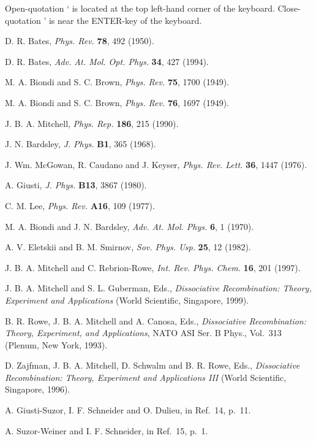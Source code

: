 \documentclass{ws-rv9x6}
\begin{document}
Open-quotation ` is located at the top left-hand corner of the keyboard.
Close-quotation ' is near the ENTER-key of the keyboard.

\begin{thebibliography}{000}
D. R. Bates, {\it Phys. Rev.} {\bf 78}, 492 (1950).

D. R. Bates, {\it Adv. At. Mol. Opt. Phys.} {\bf 34}, 427 (1994).

M. A. Biondi and S. C. Brown, {\it Phys. Rev.} {\bf 75}, 1700 (1949).

M. A. Biondi and S. C. Brown, {\it Phys. Rev.} {\bf 76}, 1697 (1949).

J. B. A. Mitchell, {\it Phys. Rep.} {\bf 186}, 215 (1990).

J. N. Bardsley, {\it J. Phys.} {\bf B1}, 365 (1968).

J. Wm. McGowan, R. Caudano and J. Keyser, {\it Phys. Rev. Lett.} 
{\bf 36}, 1447 (1976).

A. Giusti, {\it J. Phys.} {\bf B13}, 3867 (1980). 

C. M. Lee, {\it Phys. Rev.} {\bf A16}, 109 (1977). 

M. A. Biondi and J. N. Bardsley, {\it Adv. At. Mol. Phys.} {\bf 6}, 1
(1970).

A. V. Eletskii and B. M. Smirnov, {\it Sov. Phys. Usp.} {\bf 25}, 12
(1982).

J. B. A. Mitchell and C. Rebrion-Rowe, {\it Int. Rev. Phys. Chem.}
{\bf 16}, 201 (1997).

J. B. A. Mitchell and S. L. Guberman, Eds., {\it Dissociative
Recombination: Theory, Experiment and Applications} (World Scientific,
Singapore, 1999).

B. R. Rowe, J. B. A. Mitchell and A. Canosa, Eds., {\it Dissociative
Recombination: Theory, Experiment, and Applications}, NATO ASI Ser. B
Phys., Vol.~313 (Plenum, New York, 1993).

D. Zajfman, J. B. A. Mitchell, D. Schwalm and B. R. Rowe, Eds., {\it
Dissociative Recombination: Theory, Experiment and Applications III}
(World Scientific, Singapore, 1996).

A. Giusti-Suzor, I. F. Schneider and O. Dulieu, in Ref.~14, p.~11.

A. Suzor-Weiner and I. F. Schneider, in Ref.~15, p.~1.


\end{thebibliography}
\end{document}
